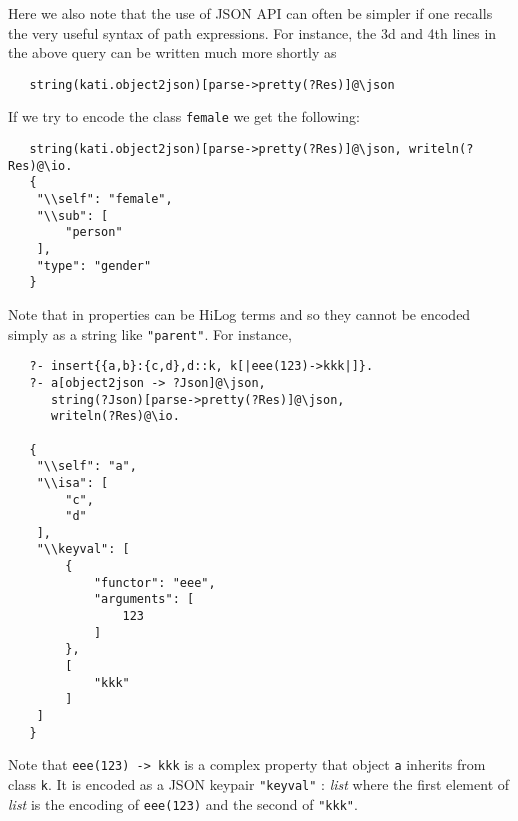 Here we also note that the use of JSON API can often be simpler if one
recalls the very useful syntax of path expressions. For instance, the 3d
and 4th lines in the above query can be written much more shortly as
\begin{verbatim}
   string(kati.object2json)[parse->pretty(?Res)]@\json
\end{verbatim}
If we try to encode the class \texttt{female} we get the following:
\begin{verbatim}
   string(kati.object2json)[parse->pretty(?Res)]@\json, writeln(?Res)@\io.
   {
    "\\self": "female",
    "\\sub": [
        "person"
    ],
    "type": "gender"
   }
\end{verbatim}
Note that in \ERGO properties can be HiLog terms and so they cannot be
encoded simply as a string like \texttt{"parent"}. For instance,
\begin{verbatim}
   ?- insert{{a,b}:{c,d},d::k, k[|eee(123)->kkk|]}.
   ?- a[object2json -> ?Json]@\json,
      string(?Json)[parse->pretty(?Res)]@\json,
      writeln(?Res)@\io.

   {
    "\\self": "a",
    "\\isa": [
        "c",
        "d"
    ],
    "\\keyval": [
        {
            "functor": "eee",
            "arguments": [
                123
            ]
        },
        [
            "kkk"
        ]
    ]
   }
\end{verbatim}
Note that \texttt{eee(123) -> kkk} is a complex property that object
\texttt{a} inherits from class \texttt{k}. It is encoded as a JSON
keypair \texttt{"\bs\bs{}keyval"} : \emph{list} where the first element of
\emph{list} is the encoding of \texttt{eee(123)} and the second of
\texttt{"kkk"}.     

